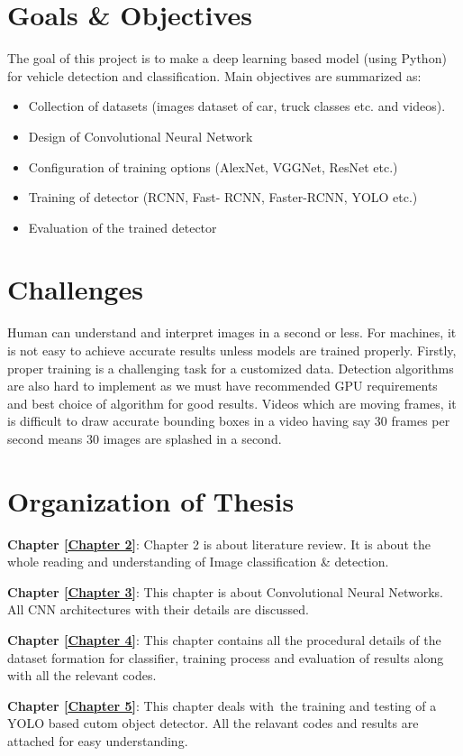 \section{Goals \& Objectives}

The goal of this project is to make a deep learning based model (using Python) for vehicle detection and classification. Main objectives are summarized as:
\begin{itemize}
\item Collection of datasets (images dataset of car, truck classes etc. and videos).
\item Design of Convolutional Neural Network
\item Configuration of training options (AlexNet, VGGNet, ResNet etc.)
\item Training of detector (RCNN, Fast- RCNN, Faster-RCNN, YOLO etc.)
\item Evaluation of the trained detector
\end{itemize}

\section{Challenges}

Human can understand and interpret images in a 
second or less. For machines, it is not easy to achieve 
accurate results unless models are trained properly. Firstly, proper 
training is a challenging task for a customized data. Detection 
algorithms are also hard to implement as we must have recommended 
GPU requirements and best choice of algorithm for good results. Videos 
which are moving frames, it is difficult to draw accurate bounding boxes 
in a video having say 30 frames per second 
means 30 images are splashed in a second. 	


\section{Organization of Thesis}

\textbf{Chapter \ref{Chapter 2}}: Chapter 2 is about literature review. It is about
the whole reading and understanding of Image classification \& detection.

\noindent\textbf{Chapter \ref{Chapter 3}}: This chapter is about Convolutional Neural Networks. All CNN architectures with their details
are discussed.

\noindent\textbf{Chapter \ref{Chapter 4}}: This chapter contains all
the procedural details of the dataset formation for classifier,
training process and evaluation of results along with all the relevant codes.

\noindent\textbf{Chapter \ref{Chapter 5}}: This chapter deals with\
the training and testing of a YOLO based cutom object detector.
All the relavant codes and results are attached for easy understanding.
